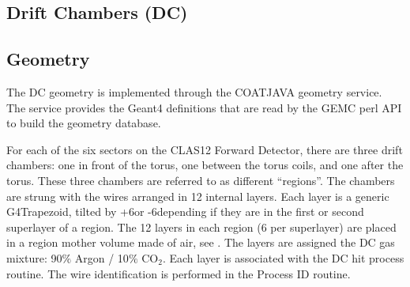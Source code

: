 \subsection{Drift Chambers (DC)}

\subsection{Geometry}

The DC geometry is implemented through the COATJAVA geometry service.
The service provides the Geant4 definitions that are read by the GEMC perl API to build the geometry database.

For each of the six sectors on the CLAS12 Forward Detector, there are three drift chambers: one in front of the torus,
one between the torus coils, and one after the torus.  These three chambers are referred to as different ``regions''.
The chambers are strung with the wires arranged in 12 internal layers.
Each layer is a generic G4Trapezoid, tilted by +6\mdeg or -6\mdeg depending if they are in the first or second
superlayer of a region.
The 12 layers in each region (6 per superlayer) are placed in a region mother volume made of air, see .
The layers are assigned the DC gas mixture: 90$\%$ Argon / 10$\%$ CO$_2$. Each layer is associated with the DC hit process routine.
The wire identification is performed in the Process ID routine.

